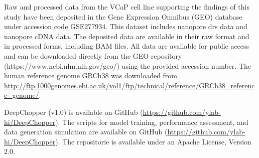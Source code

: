 \documentclass[pdflatex,sn-nature, lineno]{sn-jnl}%
\theoremstyle{thmstyleone}%
\theoremstyle{thmstyletwo}%
\theoremstyle{thmstylethree}%
\begin{document}



Raw and processed data from the VCaP cell line supporting the findings of this study have been deposited in the Gene Expression Omnibus (GEO) database under accession code GSE277934.
This dataset includes nanopore \gls{drs} data and nanopore cDNA data.
The deposited data are available in their raw format and in processed forms, including BAM files.
All data are available for public access and can be downloaded directly from the GEO repository (https://www.ncbi.nlm.nih.gov/geo/) using the provided accession number.
The human reference genome GRCh38 was downloaded from \url{http://ftp.1000genomes.ebi.ac.uk/vol1/ftp/technical/reference/GRCh38\_reference\_genome/}.



DeepChopper (v1.0) is available on GitHub (\url{https://github.com/ylab-hi/DeepChopper}).
The scripts for model training, performance assessment, and data generation simulation are available on GitHub (\url{https://github.com/ylab-hi/DeepChopper}).
The repositorie is available under an Apache License, Version 2.0.

\end{document}
